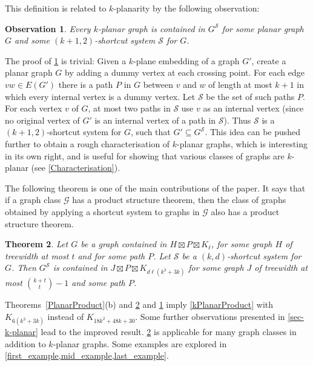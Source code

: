\documentclass{patmorin}
\theoremstyle{plain}
\newtheorem{thm}{Theorem}
\newtheorem{obs}[thm]{Observation}
\theoremstyle{definition}
\newcommand{\note}[2]{\noindent{\color{red}[#1:~#2]}}
\newcommand{\referee}[2]{\noindent\textcolor{blue}{\framebox{\begin{minipage}{\textwidth} Ref \#{#1}: #2\end{minipage}}}}
\renewcommand{\SS}{\mathcal{S}}
\begin{document}
This definition is related to $k$-planarity by the following observation:

\begin{obs}
\label{AddDummy}
Every $k$-planar graph is contained in $G^\SS$ for some planar graph $G$ and some $(k+1,2)$-shortcut system $\SS$ for $G$.
\end{obs}

The proof of \cref{AddDummy} is trivial: Given a $k$-plane embedding of a graph $G'$, create a planar graph $G$ by adding a dummy vertex at each crossing point. For each edge $vw\in E(G')$ there is a path $P$ in $G$ between $v$ and $w$ of length at most $k+1$ in which every internal vertex is a dummy vertex. Let $\SS$ be the set of such paths $P$. For each vertex $v$ of $G$, at most two paths in $\SS$ use $v$ as an internal vertex (since no original vertex of $G'$ is an internal vertex of a path in $\SS$). Thus $\SS$ is a $(k+1,2)$-shortcut system for $G$, such that $G'\subseteq G^\SS$. This idea can be pushed further to obtain a rough characterisation of $k$-planar graphs, which is interesting in its own right, and is useful for showing that various classes of graphs are $k$-planar (see \cref{Characterisation}).


The following theorem is one of the main contributions of the paper. It says that if a graph class $\mathcal{G}$ has a product structure theorem, then the class of graphs obtained by applying a shortcut system to graphs in $\mathcal{G}$ also has a product structure theorem.

\begin{thm}
\label{ShortcutProduct}
Let $G$ be a graph contained in $H\boxtimes P \boxtimes K_\ell$, for some graph $H$ of treewidth at most $t$ and for some path $P$. Let $\SS$ be a $(k,d)$-shortcut system for $G$. Then $G^\SS$ is contained in $J\boxtimes P\boxtimes K_{d\ell(k^3+3k)}$ for some graph $J$ of treewidth at most $\binom{k+t}{t}-1$ and some path $P$.
\end{thm}



Theorems~\ref{PlanarProduct}(b) and \ref{ShortcutProduct} and \cref{AddDummy} imply \cref{kPlanarProduct} with $K_{6(k^3+3k)}$ instead of $K_{18k^2+48k+30}$. Some further observations presented in \cref{sec-k-planar} lead to the improved result.  \cref{ShortcutProduct} is applicable for many graph classes in addition to $k$-planar graphs. Some examples are explored in \cref{first_example,mid_example,last_example}.
\end{document}
